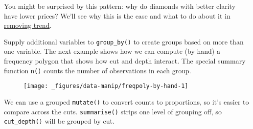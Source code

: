 You might be surprised by this pattern: why do diamonds with better
clarity have lower prices? We'll see why this is the case and what to do
about it in \hyperref[sub:trend]{removing trend}.

Supply additional variables to \texttt{group\_by()} to create groups
based on more than one variable. The next example shows how we can
compute (by hand) a frequency polygon that shows how cut and depth
interact. The special summary function \texttt{n()} counts the number of
observations in each group.

\begin{Shaded}
\begin{Highlighting}[]
\StringTok{ }\NormalTok{(} \NormalTok{())}
\StringTok{ }\StringTok{ }\StringTok{ }\NormalTok{)}
\CommentTok{#> }

 \StringTok{ }
\StringTok{  }\NormalTok{()}
\end{Highlighting}
\end{Shaded}

\begin{figure}[H]
  \centering
  \texttt{[image: \_figures/data-manip/freqpoly-by-hand-1]}
\end{figure}

We can use a grouped \texttt{mutate()} to convert counts to proportions,
so it's easier to compare across the cuts. \texttt{summarise()} strips
one level of grouping off, so \texttt{cut\_depth()} will be grouped by
cut.

\begin{Shaded}
\begin{Highlighting}[]
\StringTok{ } \StringTok{ }
 \StringTok{ }
\StringTok{  }\NormalTok{()}
\end{Highlighting}
\end{Shaded}

